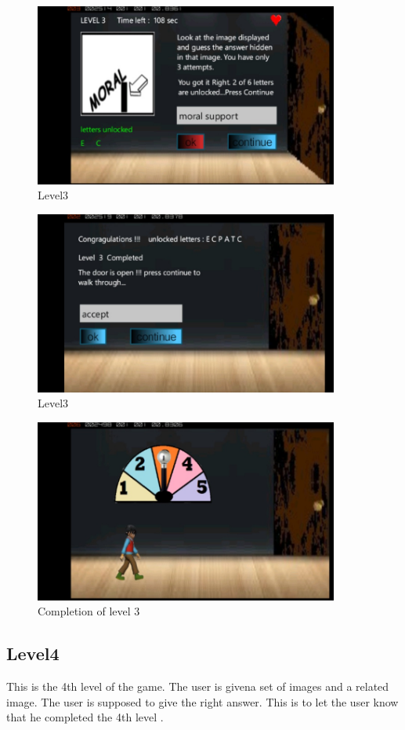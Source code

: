 \begin{figure}[htbp]
	\centering
	\includegraphics[width=10cm,height=6cm]{8.jpg}
	\caption{Level3}
\end{figure}
\begin{figure}[htbp]
	\centering
	\includegraphics[width=10cm,height=6cm]{9.jpg}
	\caption{Level3}
\end{figure}
\begin{figure}[htbp]
	\centering
	\includegraphics[width=10cm,height=6cm]{10.jpg}
	\caption{Completion of level 3}
\end{figure}

\subsection{Level4}
\hspace{1cm}This is the 4th level of the game. The user is givena set of images and a related image. The user is supposed to give the right answer. This is to let the user know that he completed the 4th level
 \cite{DBLP:journals/ivc/KadyrovP03}.\\

